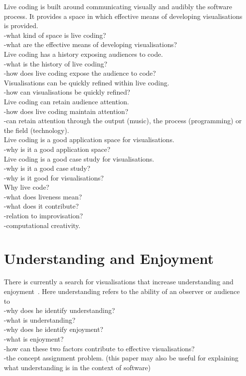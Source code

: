 Live coding is built around communicating visually and audibly the software process. It provides a space in which effective means of developing visualisations is provided. \\
-what kind of space is live coding?\\
-what are the effective means of developing visualisations?\\

Live coding has a history exposing audiences to code.\\
-what is the history of live coding?\\
-how does live coding expose the audience to code?\\

Visualisations can be quickly refined within live coding.\\
-how can visualisations be quickly refined?\\

Live coding can retain audience attention.\\
-how does live coding maintain attention?\\
-can retain attention through the output (music), the process (programming) or the field (technology).\\


Live coding is a good application space for visualisations.\\
-why is it a good application space?\\

Live coding is a good case study for visualisations.\\
-why is it a good case study?\\
-why is it good for visualisations?\\

Why live code?\\
-what does liveness mean? \cite{Auslander}\\
-what does it contribute?\\
-relation to improvisation?\\
-computational creativity. \cite{Mclean}\\

\section{Understanding and Enjoyment}

There is currently a search for visualisations that increase understanding and enjoyment~\cite{McLean2010a}. Here understanding refers to the ability of an observer or audience to \\
-why does he identify understanding?\\
-what is understanding?\\
-why does he identify enjoyment?\\
-what is enjoyment?\\
-how can these two factors contribute to effective visualisations?\\
-the concept assignment problem. \cite{Biggerstaff1994} (this paper may also be useful for explaining what understanding is in the context of software)\\

